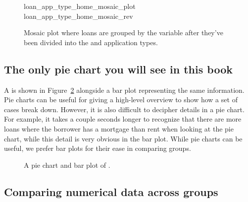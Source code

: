 \begin{figure}[h]
  \centering
      {loan_app_type_home_mosaic_plot}
      {loan_app_type_home_mosaic_rev}
  \caption{Mosaic plot where loans are grouped by
      the  variable after they've
      been divided into the  and
       application types.}
  \label{loan_app_type_home_mosaic_rev}
\end{figure}



\subsection{The only pie chart you will see in this book}

A  is shown in
Figure~\ref{loan_homeownership_pie_chart} alongside
a bar plot representing the same information.
Pie charts can be useful for giving a high-level overview
to show how a set of cases break down.
However, it is also difficult to decipher details
in a pie chart.
For example, it takes a couple seconds longer to recognize
that there are more loans where the borrower has
a mortgage than rent when looking at the pie chart,
while this detail is very obvious in the bar plot.
While pie charts can be useful, we prefer bar plots
for their ease in comparing groups.

\begin{figure}[h]
  \centering
  \caption{A pie chart and bar plot of .}
  \label{loan_homeownership_pie_chart}
\end{figure}


\subsection{Comparing numerical data across groups}
\label{comparingAcrossGroups}

